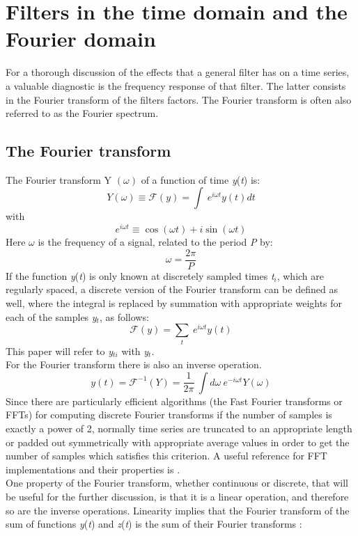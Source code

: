 \documentclass[english,blauw]{cbsdiscussionpaper}
\begin{document}
\section{Filters in the time domain and the Fourier domain}
For a thorough discussion of the effects that a general filter has on a time series, a valuable diagnostic is the frequency response of that filter. The latter consists in the Fourier transform of the filters factors. The Fourier transform is often also referred to as the Fourier spectrum.\\ 
\subsection{The Fourier transform}
The Fourier transform Y $(\omega)$ of a function of time \textit{y}(\textit{t}) is:
\begin{equation}
Y (\omega)\equiv \mathcal{F} (\textit{y})= \int \ e^{i \omega t} y(\textit{t}) dt
\end{equation}
with
\begin{equation*}
e^{i \omega t} \equiv \cos(\omega t) + i \sin(\omega t)
\end{equation*}
Here $\omega$ is the frequency of a signal, related to the period \textit{P} by:
\begin{equation}
\omega = \frac {2\pi}{P}
\end{equation}
If the function \textit{y}(\textit{t}) is only known at discretely sampled times \textit{t$_i$}, which are regularly spaced, a discrete version of the Fourier transform can be defined as well, where the integral is replaced by summation with appropriate weights for each of the samples \textit{y$_t$}, as follows:
\begin{equation}
\mathcal{F}(y) = \sum_t  \ e^{i \omega t} y(\textit{t})
\end{equation}
This paper will refer to \textit{y$_{ti}$} with \textit{y$_t$}.\\
For the Fourier transform there is also an inverse operation.
\begin{equation}
y(\textit{t}) = \mathcal{F}^{-1} (Y) = \frac {1}{2 \pi} \ \int d\omega \ e^{-i \omega t} Y(\omega)
\end{equation}
Since there are particularly efficient algorithms (the Fast Fourier transforms or FFTs) for computing discrete Fourier transforms if the number of samples is exactly a power of 2, normally time series are truncated to an appropriate length or padded out symmetrically with appropriate average values in order to get the number of samples which satisfies this criterion. A useful reference for FFT implementations and their properties is \citep{presea1992}.\\One property of the Fourier transform, whether continuous or discrete, that will be useful for the further discussion, is that it is a linear operation, and therefore so are the inverse operations. Linearity implies that the Fourier transform of the sum of functions \textit{y}(\textit{t}) and \textit{z}(\textit{t}) is the sum of their Fourier transforms \citep{bracewell1965}:
\end{document}
